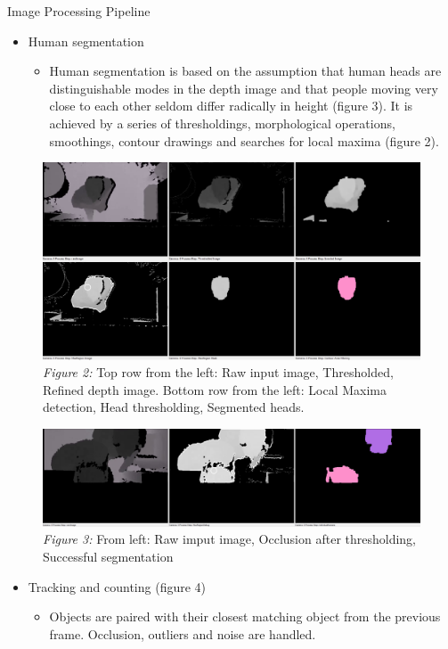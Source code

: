 \documentclass[final,hyperref={pdfpagelabels=false}]{beamer}
\begin{document}
\begin{frame}[t]
\begin{columns}[t]
\begin{column}{.465\textwidth}
\begin{block}{
\vspace*{-0.002\textheight}
Image Processing Pipeline
}
\begin{itemize}
	\item Human segmentation
	\begin{itemize}
	\item Human segmentation is based on the assumption that human heads are distinguishable modes in the depth image and that people moving very close to each other seldom differ radically in height (figure 3). It is achieved by a series of thresholdings, morphological operations, smoothings, contour drawings and searches for local maxima (figure 2).
	\end{itemize}
\end{itemize}
\begin{figure}
	\includegraphics[width=0.9\linewidth]{humanSegmentationSteps.png}
	\caption{\centering \textit{Figure 2:} Top row from the left: Raw input image, Thresholded, Refined depth image. \newline 
			 			 Bottom row from the left: Local Maxima detection, Head thresholding, Segmented heads. }
\end{figure}
\begin{figure}
	\includegraphics[width=0.9\linewidth]{KinectSegmentationIllustration_occlusionHandling_horizontal.png}
	\caption{\textit{Figure 3:} From left: Raw imput image, Occlusion after thresholding, Successful segmentation}
\end{figure}

\begin{itemize}
	\item Tracking and counting (figure 4)
	\begin{itemize}
		\item Objects are paired with their closest matching object from the previous frame. Occlusion, outliers and noise are handled.
		

\end{itemize}
\end{itemize}
\end{block}
\end{column}
\end{columns}
\end{frame}
\end{document}
